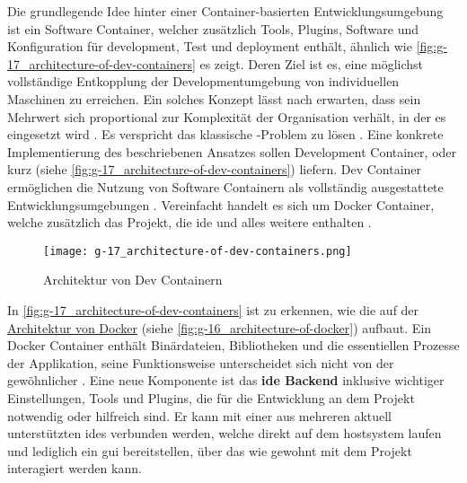 Die grundlegende Idee hinter einer Container-basierten Entwicklungsumgebung ist ein Software Container, welcher zusätzlich Tools, Plugins, Software und Konfiguration für \Gls{development}, Test und \Gls{deployment} enthält, ähnlich wie \autoref{fig:g-17_architecture-of-dev-containers} es zeigt. Deren Ziel ist es, eine möglichst vollständige Entkopplung der Developmentumgebung von individuellen Maschinen zu erreichen. Ein solches Konzept lässt nach \citeauthor{014:Managing-Container-based-Software-Development-Environments} erwarten, dass sein Mehrwert sich proportional zur Komplexität der Organisation verhält, in der es eingesetzt wird \cite{014:Managing-Container-based-Software-Development-Environments}. Es verspricht das klassische -Problem zu lösen \cite{204:Development-Containers-Simplified}. Eine konkrete Implementierung des beschriebenen Ansatzes sollen Development Container, oder kurz  (siehe \autoref{fig:g-17_architecture-of-dev-containers}) liefern. Dev Container ermöglichen die Nutzung von Software Containern als vollständig ausgestattete Entwicklungsumgebungen \cite{303:Introduction-to-DevContainers,305:Using-DevContainers-in-JetBrains-IDEs,306:Development-Containers}. Vereinfacht handelt es sich um Docker Container, welche zusätzlich das Projekt, die \Gls{ide} und alles weitere enthalten \cite{305:Using-DevContainers-in-JetBrains-IDEs}.

\begin{figure}[h]
    \centering
    \texttt{[image: g-17\_architecture-of-dev-containers.png]}
    \caption{Architektur von Dev Containern}
    \label{fig:g-17_architecture-of-dev-containers}
\end{figure}

In \autoref{fig:g-17_architecture-of-dev-containers} ist zu erkennen, wie die  auf der \hyperref[fig:g-16_architecture-of-docker]{Architektur von Docker} (siehe \autoref{fig:g-16_architecture-of-docker}) aufbaut. Ein Docker Container enthält Binärdateien, Bibliotheken und die essentiellen Prozesse der Applikation, seine Funktionsweise unterscheidet sich nicht von der gewöhnlicher . Eine neue Komponente ist das \textbf{\Gls{ide} Backend} inklusive wichtiger Einstellungen, Tools und Plugins, die für die Entwicklung an dem Projekt notwendig oder hilfreich sind. Er kann mit einer aus mehreren aktuell unterstützten \Glspl{ide} verbunden werden, welche direkt auf dem \Gls{hostsystem} laufen und lediglich ein \Gls{gui} bereitstellen, über das wie gewohnt mit dem Projekt interagiert werden kann.

